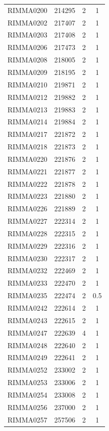 \documentclass[11pt]{article}
\newcounter{rowno}
\begin{document}
\begin{scriptsize}
\begin{longtable}{>{\stepcounter{rowno}}cccc}
    RIMMA0200 & 214295 & 2     & 1 \\
    RIMMA0202 & 217407 & 2     & 1 \\
    RIMMA0203 & 217408 & 2     & 1 \\
    RIMMA0206 & 217473 & 2     & 1 \\
    RIMMA0208 & 218005 & 2     & 1 \\
    RIMMA0209 & 218195 & 2     & 1 \\
    RIMMA0210 & 219871 & 2     & 1 \\
    RIMMA0212 & 219882 & 2     & 1 \\
    RIMMA0213 & 219883 & 2     & 1 \\
    RIMMA0214 & 219884 & 2     & 1 \\
    RIMMA0217 & 221872 & 2     & 1 \\
    RIMMA0218 & 221873 & 2     & 1 \\
    RIMMA0220 & 221876 & 2     & 1 \\
    RIMMA0221 & 221877 & 2     & 1 \\
    RIMMA0222 & 221878 & 2     & 1 \\
    RIMMA0223 & 221880 & 2     & 1 \\
    RIMMA0226 & 221889 & 2     & 1 \\
    RIMMA0227 & 222314 & 2     & 1 \\
    RIMMA0228 & 222315 & 2     & 1 \\
    RIMMA0229 & 222316 & 2     & 1 \\
    RIMMA0230 & 222317 & 2     & 1 \\
    RIMMA0232 & 222469 &  2     & 1 \\
    RIMMA0233 & 222470 & 2     & 1 \\
    RIMMA0235 & 222474 & 2     & 0.5 \\
    RIMMA0242 & 222614 & 2     & 1 \\
    RIMMA0243 & 222615 & 2     & 1 \\
    RIMMA0247 & 222639 & 4     & 1 \\
    RIMMA0248 & 222640 & 2     & 1 \\
    RIMMA0249 & 222641 & 2     & 1 \\
    RIMMA0252 & 233002 & 2     & 1 \\
    RIMMA0253 & 233006 & 2     & 1 \\
    RIMMA0254 & 233008 & 2     & 1 \\
    RIMMA0256 & 237000 & 2     & 1 \\
    RIMMA0257 & 257506 & 2     & 1 \\

\end{longtable}
\end{scriptsize}
\end{document}
